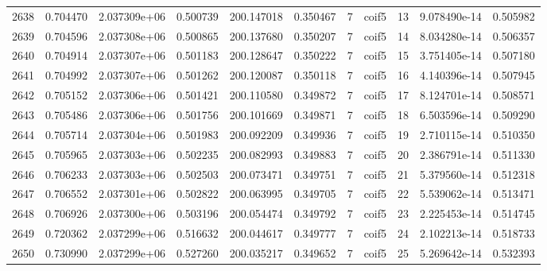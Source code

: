 \begin{tabular}{lrrrrrrlrrr}
2638 &    0.704470 &        2.037309e+06 &  0.500739 &              200.147018 &    0.350467 &       7 &        coif5 &     13 &   9.078490e-14 &      0.505982 \\
2639 &    0.704596 &        2.037308e+06 &  0.500865 &              200.137680 &    0.350207 &       7 &        coif5 &     14 &   8.034280e-14 &      0.506357 \\
2640 &    0.704914 &        2.037307e+06 &  0.501183 &              200.128647 &    0.350222 &       7 &        coif5 &     15 &   3.751405e-14 &      0.507180 \\
2641 &    0.704992 &        2.037307e+06 &  0.501262 &              200.120087 &    0.350118 &       7 &        coif5 &     16 &   4.140396e-14 &      0.507945 \\
2642 &    0.705152 &        2.037306e+06 &  0.501421 &              200.110580 &    0.349872 &       7 &        coif5 &     17 &   8.124701e-14 &      0.508571 \\
2643 &    0.705486 &        2.037306e+06 &  0.501756 &              200.101669 &    0.349871 &       7 &        coif5 &     18 &   6.503596e-14 &      0.509290 \\
2644 &    0.705714 &        2.037304e+06 &  0.501983 &              200.092209 &    0.349936 &       7 &        coif5 &     19 &   2.710115e-14 &      0.510350 \\
2645 &    0.705965 &        2.037303e+06 &  0.502235 &              200.082993 &    0.349883 &       7 &        coif5 &     20 &   2.386791e-14 &      0.511330 \\
2646 &    0.706233 &        2.037303e+06 &  0.502503 &              200.073471 &    0.349751 &       7 &        coif5 &     21 &   5.379560e-14 &      0.512318 \\
2647 &    0.706552 &        2.037301e+06 &  0.502822 &              200.063995 &    0.349705 &       7 &        coif5 &     22 &   5.539062e-14 &      0.513471 \\
2648 &    0.706926 &        2.037300e+06 &  0.503196 &              200.054474 &    0.349792 &       7 &        coif5 &     23 &   2.225453e-14 &      0.514745 \\
2649 &    0.720362 &        2.037299e+06 &  0.516632 &              200.044617 &    0.349777 &       7 &        coif5 &     24 &   2.102213e-14 &      0.518733 \\
2650 &    0.730990 &        2.037299e+06 &  0.527260 &              200.035217 &    0.349652 &       7 &        coif5 &     25 &   5.269642e-14 &      0.532393 \\

\end{tabular}
